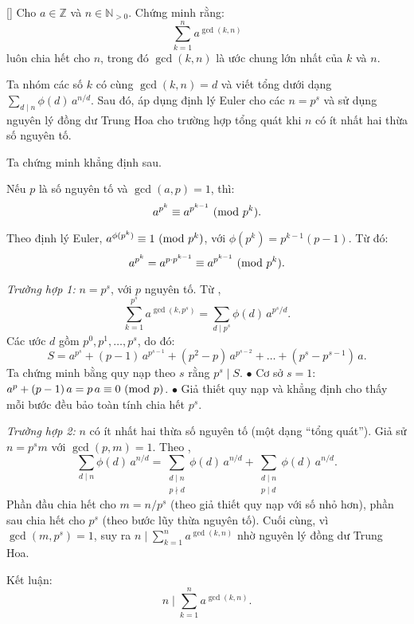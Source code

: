 \documentclass[../03-arithmetic-functions.tex]{subfiles}
\begin{document}
\begin{example*}\label{example:ROU-2015-TST-D2-P1}[\textbf{}]
    Cho \( a \in \mathbb{Z} \) và \( n \in \mathbb{N}_{>0} \). Chứng minh rằng:
    \[
        \sum_{k=1}^{n} a^{\gcd(k,n)}
    \]
    luôn chia hết cho \( n \), trong đó \( \gcd(k,n) \) là ước chung lớn nhất của \( k \) và \( n \).
\end{example*}

\begin{story*}
    Ta nhóm các số \( k \) có cùng \(\gcd(k,n)=d\) và viết tổng dưới dạng \(\sum_{d \mid n} \phi(d) \, a^{n/d}\). Sau đó, áp dụng định lý Euler cho các \(n = p^s\) và sử dụng nguyên lý đồng dư Trung Hoa cho trường hợp tổng quát khi \(n\) có ít nhất hai thừa số nguyên tố.
\end{story*}

\bigbreak

\begin{soln}
    Ta chứng minh khẳng định sau.
    \begin{claim*}
        Nếu \( p \) là số nguyên tố và \( \gcd(a,p)=1 \), thì:
        \[
            a^{p^k} \equiv a^{p^{k-1}} \ (\mathrm{mod}\ p^k).
        \]
    \end{claim*}

    \begin{subproof}
        Theo định lý Euler, \( a^{\phi(p^k)} \equiv 1 \ (\mathrm{mod}\ p^k)\), với \(\phi(p^k)=p^{k-1}(p-1)\). Từ đó:
        \[
            a^{p^k} = a^{p \cdot p^{k-1}} \equiv a^{p^{k-1}} \ (\mathrm{mod}\ p^k).
        \]
    \end{subproof}

    \textit{Trường hợp 1:} \( n = p^s \), với \( p \) nguyên tố.  
    Từ ,
    \[
        \sum_{k=1}^{p^s} a^{\gcd(k,p^s)} = \sum_{d \mid p^s} \phi(d) \, a^{p^s/d}.
    \]
    Các ước \( d \) gồm \( p^0, p^1, \dots, p^s \), do đó:
    \[
        S = a^{p^s} + (p-1) \, a^{p^{s-1}} + (p^2 - p) \, a^{p^{s-2}} + \dots + (p^s - p^{s-1}) \, a.
    \]
    Ta chứng minh bằng quy nạp theo \( s \) rằng \( p^s \mid S \).  
    \(\bullet\) Cơ sở \( s = 1 \): \( a^p + (p-1) \, a = p \, a \equiv 0 \ (\mathrm{mod}\ p) \).  
    \(\bullet\) Giả thiết quy nạp và khẳng định cho thấy mỗi bước đều bảo toàn tính chia hết \( p^s \).  

    \textit{Trường hợp 2:} \( n \) có ít nhất hai thừa số nguyên tố (một dạng “tổng quát”).  
    Giả sử \( n = p^s m \) với \( \gcd(p,m) = 1 \). Theo ,
    \[
        \sum_{d \mid n} \phi(d) \, a^{n/d} = \sum_{\substack{d \mid n \\ p \nmid d}} \phi(d) \, a^{n/d} + \sum_{\substack{d \mid n \\ p \mid d}} \phi(d) \, a^{n/d}.
    \]
    Phần đầu chia hết cho \( m = n/p^s \) (theo giả thiết quy nạp với số nhỏ hơn), phần sau chia hết cho \( p^s \) (theo bước lũy thừa nguyên tố). Cuối cùng, vì \( \gcd(m, p^s) = 1 \), suy ra \( n \mid \sum_{k=1}^n a^{\gcd(k,n)} \) nhờ nguyên lý đồng dư Trung Hoa.

    Kết luận:
    \[
        n \mid \sum_{k=1}^{n} a^{\gcd(k,n)}.
    \]
\end{soln}

\end{document}
